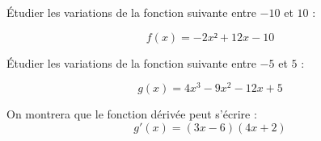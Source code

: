 
\begin{questions}
	
	\question[4] \'Etudier les variations de la fonction suivante entre $-10$ et $10$ :
	
	\begin{equation*}
	f(x) = -2x²+12x - 10
	\end{equation*}
	
	\fillwithdottedlines{20cm}
	
	\question[6] \'Etudier les variations de la fonction suivante entre $-5$ et $5$ :
	
	\begin{equation*}
	g(x) = 4x^3- 9x^2 - 12x + 5
	\end{equation*}
	
	On montrera que le fonction dérivée peut s'écrire :
	\begin{equation*}
	g'(x) = (3x - 6) (4x + 2)
	\end{equation*}
	
	\fillwithdottedlines{20cm}
\end{questions}